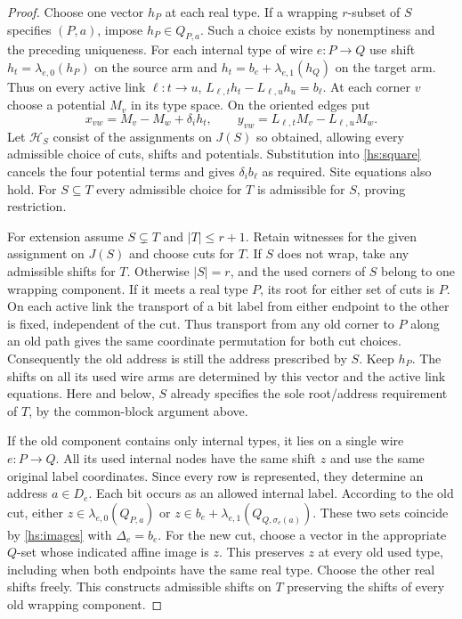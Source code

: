 \documentclass[11pt]{article}
\theoremstyle{definition}
\theoremstyle{remark}
\numberwithin{equation}{section}
\begin{document}
\begin{proof}
Choose one vector $h_P$ at each real type. If a wrapping $r$-subset of
$S$ specifies $(P,a)$, impose $h_P\in Q_{P,a}$. Such a choice exists
by nonemptiness and the preceding uniqueness. For each internal type
of wire $e:P\to Q$ use shift $h_t=\lambda_{e,0}(h_P)$ on the source
arm and $h_t=b_e+\lambda_{e,1}(h_Q)$ on the target arm. Thus on every
active link $\ell:t\to u$,
$L_{\ell,t}h_t-L_{\ell,u}h_u=b_\ell$.
At each corner $v$ choose a potential $M_v$ in its type space.
On the oriented edges put
\begin{equation}
 x_{vw}=M_v-M_w+\delta_i h_t,\qquad
 y_{vw}=L_{\ell,t}M_v-L_{\ell,u}M_w .
 \label{hs:potentials}
\end{equation}
Let $\mathcal H_S$ consist of the assignments on $J(S)$ so obtained,
allowing every admissible choice of cuts, shifts and potentials.
Substitution into \eqref{hs:square} cancels the four potential terms
and gives $\delta_i b_\ell$ as required. Site equations also hold.
For $S\subseteq T$ every admissible choice for $T$ is admissible for
$S$, proving restriction.

For extension assume $S\subsetneq T$ and $|T|\le r+1$. Retain witnesses
for the given assignment on $J(S)$ and choose cuts for $T$. If $S$
does not wrap, take any admissible shifts for $T$. Otherwise
$|S|=r$, and the used corners of $S$ belong to one wrapping component.
If it meets a real type $P$, its root for either set of cuts is $P$.
On each active link the transport of a bit label from either endpoint
to the other is fixed, independent of the cut. Thus transport from any
old corner to $P$ along an old path gives the same coordinate
permutation for both cut choices. Consequently the old address is still
the address prescribed by $S$. Keep $h_P$. The shifts on all its used
wire arms are determined by this vector and the active link equations.
Here and below, $S$ already specifies the sole root/address requirement
of $T$, by the common-block argument above.

If the old component contains only internal types, it lies on a single
wire $e:P\to Q$. All its used internal nodes have the same shift $z$
and use the same original label coordinates. Since every row is
represented, they determine an address $a\in D_e$. Each bit occurs
as an allowed internal label. According to the old cut, either
$z\in\lambda_{e,0}(Q_{P,a})$ or
$z\in b_e+\lambda_{e,1}(Q_{Q,\sigma_e(a)})$.
These two sets coincide by \eqref{hs:images} with $\Delta_e=b_e$.
For the new cut, choose a vector in the appropriate $Q$-set
whose indicated affine image is $z$. This preserves $z$ at every old
used type, including when both endpoints have the same real type.
Choose the other real shifts freely. This constructs admissible shifts
on $T$ preserving the shifts of every old wrapping component.


\end{proof}
\end{document}
